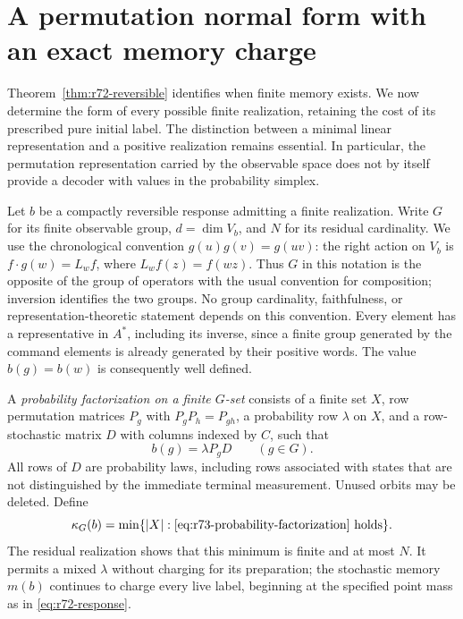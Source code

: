 \section{A permutation normal form with an exact memory charge}
\label{sec:r73-normal-form}

Theorem~\ref{thm:r72-reversible} identifies when finite memory exists. We now
determine the form of every possible finite realization, retaining the cost of
its prescribed pure initial label. The distinction between a minimal linear
representation and a positive realization remains essential. In particular,
the permutation representation carried by the observable space does not by
itself provide a decoder with values in the probability simplex.

Let $b$ be a compactly reversible response admitting a finite realization.
Write $G$ for its finite observable group, $d=\dim V_b$, and $N$ for its residual
cardinality. We use the chronological convention $g(u)g(v)=g(uv)$: the right
action on $V_b$ is $f\cdot g(w)=L_wf$, where $L_wf(z)=f(wz)$. Thus $G$ in this
notation is the opposite of the group of operators with the usual convention
for composition; inversion identifies the two groups. No group cardinality,
faithfulness, or representation-theoretic statement depends on this convention.
Every element has a representative in $A^*$, including its inverse, since a
finite group generated by the command elements is already generated by their
positive words. The value $b(g)=b(w)$ is consequently well defined.

A \emph{probability factorization on a finite $G$-set} consists of a finite set
$X$, row permutation matrices $P_g$ with $P_gP_h=P_{gh}$, a probability row
$\lambda$ on $X$, and a row-stochastic matrix $D$ with columns indexed by $C$,
such that
\begin{equation}\label{eq:r73-probability-factorization}
 b(g)=\lambda P_gD\qquad(g\in G).
\end{equation}
All rows of $D$ are probability laws, including rows associated with states
that are not distinguished by the immediate terminal measurement. Unused
orbits may be deleted. Define
\[
 \kappa_G(b)=\min\{|X|:\text{\eqref{eq:r73-probability-factorization} holds}\}.
\]
The residual realization shows that this minimum is finite and at most $N$.
It permits a mixed $\lambda$ without charging for its preparation; the
stochastic memory $m(b)$ continues to charge every live label, beginning at
the specified point mass as in \eqref{eq:r72-response}.

